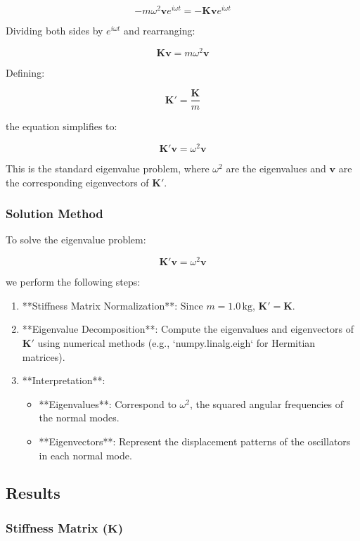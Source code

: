 \documentclass[12pt]{report} %
\begin{document}
\[
-m \omega^2 \mathbf{v} e^{i \omega t} = -\mathbf{K} \mathbf{v} e^{i \omega t}
\]

Dividing both sides by \( e^{i \omega t} \) and rearranging:

\[
\mathbf{K} \mathbf{v} = m \omega^2 \mathbf{v}
\]

Defining:

\[
\mathbf{K'} = \frac{\mathbf{K}}{m}
\]

the equation simplifies to:

\[
\mathbf{K'} \mathbf{v} = \omega^2 \mathbf{v}
\]

This is the standard eigenvalue problem, where \( \omega^2 \) are the eigenvalues and \( \mathbf{v} \) are the corresponding eigenvectors of \( \mathbf{K'} \).

\subsubsection{Solution Method}
\label{subsubsec:part2_task2_solution}

To solve the eigenvalue problem:

\[
\mathbf{K'} \mathbf{v} = \omega^2 \mathbf{v}
\]

we perform the following steps:

\begin{enumerate}
    \item **Stiffness Matrix Normalization**: Since \( m = 1.0 \, \text{kg} \), \( \mathbf{K'} = \mathbf{K} \).
    \item **Eigenvalue Decomposition**: Compute the eigenvalues and eigenvectors of \( \mathbf{K'} \) using numerical methods (e.g., `numpy.linalg.eigh` for Hermitian matrices).
    \item **Interpretation**:
    \begin{itemize}
        \item **Eigenvalues**: Correspond to \( \omega^2 \), the squared angular frequencies of the normal modes.
        \item **Eigenvectors**: Represent the displacement patterns of the oscillators in each normal mode.
    \end{itemize}
\end{enumerate}

\subsection{Results}
\label{subsec:part2_task2_results}

\subsubsection{Stiffness Matrix (\( \mathbf{K} \))}
\label{subsubsec:part2_task2_K_matrix_result}
\end{document}

